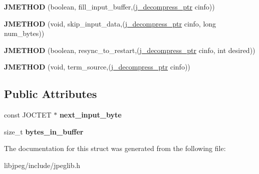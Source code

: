 \begin{DoxyCompactItemize}
\item 
\hypertarget{structjpeg__source__mgr_ab4a579b1f50108e2de73c7c0c1bbb9fd}{{\bfseries J\-M\-E\-T\-H\-O\-D} (boolean, fill\-\_\-input\-\_\-buffer,(\hyperlink{structjpeg__decompress__struct}{j\-\_\-decompress\-\_\-ptr} cinfo))}\label{structjpeg__source__mgr_ab4a579b1f50108e2de73c7c0c1bbb9fd}

\item 
\hypertarget{structjpeg__source__mgr_a3e29df8ddadb0c15e54b69b5a7a10305}{{\bfseries J\-M\-E\-T\-H\-O\-D} (void, skip\-\_\-input\-\_\-data,(\hyperlink{structjpeg__decompress__struct}{j\-\_\-decompress\-\_\-ptr} cinfo, long num\-\_\-bytes))}\label{structjpeg__source__mgr_a3e29df8ddadb0c15e54b69b5a7a10305}

\item 
\hypertarget{structjpeg__source__mgr_a60a35ccd1fb8d954f34c0cdbf29ac010}{{\bfseries J\-M\-E\-T\-H\-O\-D} (boolean, resync\-\_\-to\-\_\-restart,(\hyperlink{structjpeg__decompress__struct}{j\-\_\-decompress\-\_\-ptr} cinfo, int desired))}\label{structjpeg__source__mgr_a60a35ccd1fb8d954f34c0cdbf29ac010}

\item 
\hypertarget{structjpeg__source__mgr_a6c0683ce1166b9ee659b2d3aa1efb1c2}{{\bfseries J\-M\-E\-T\-H\-O\-D} (void, term\-\_\-source,(\hyperlink{structjpeg__decompress__struct}{j\-\_\-decompress\-\_\-ptr} cinfo))}\label{structjpeg__source__mgr_a6c0683ce1166b9ee659b2d3aa1efb1c2}

\end{DoxyCompactItemize}
\subsection*{Public Attributes}
\begin{DoxyCompactItemize}
\item 
\hypertarget{structjpeg__source__mgr_a55ae87eab1cd62314f215c0a33b0f018}{const J\-O\-C\-T\-E\-T $\ast$ {\bfseries next\-\_\-input\-\_\-byte}}\label{structjpeg__source__mgr_a55ae87eab1cd62314f215c0a33b0f018}

\item 
\hypertarget{structjpeg__source__mgr_a8ecb72557c1c9666d77fffea074282a4}{size\-\_\-t {\bfseries bytes\-\_\-in\-\_\-buffer}}\label{structjpeg__source__mgr_a8ecb72557c1c9666d77fffea074282a4}

\end{DoxyCompactItemize}


The documentation for this struct was generated from the following file\-:\begin{DoxyCompactItemize}
\item 
libjpeg/include/jpeglib.\-h\end{DoxyCompactItemize}

